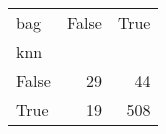 \begin{tabular}{lrr}
\toprule
bag &  False &  True  \\
knn   &        &        \\
\midrule
False &     29 &     44 \\
True  &     19 &    508 \\
\bottomrule
\end{tabular}
